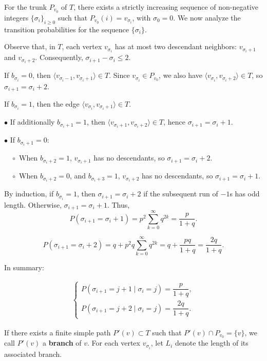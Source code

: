 \documentclass[10pt,twoside]{article}
\begin{document}
For the trunk $P_{v_0}$ of $T$, there exists a strictly increasing sequence of non-negative integers $\{\sigma_i\}_{i \geq 0}$ such that $P_{v_0}(i) = v_{\sigma_i}$, with $\sigma_0 = 0$. We now analyze the transition probabilities for the sequence $\{\sigma_i\}$.

Observe that, in $T$, each vertex $v_{\sigma_i}$ has at most two descendant neighbors: $v_{\sigma_i + 1}$ and $v_{\sigma_i + 2}$. Consequently, $\sigma_{i+1} - \sigma_i \leq 2$.

If $b_{\sigma_i} = 0$, then $\langle v_{\sigma_i - 1}, v_{\sigma_i + 1} \rangle \in T$. Since $v_{\sigma_i} \in P_{v_0}$, we also have $\langle v_{\sigma_i}, v_{\sigma_i + 2} \rangle \in T$, so $\sigma_{i+1} = \sigma_i + 2$.

If $b_{\sigma_i} = 1$, then the edge $\langle v_{\sigma_i}, v_{\sigma_i + 1} \rangle \in T$.

$\bullet$ If additionally $b_{\sigma_i + 1} = 1$, then $\langle v_{\sigma_i + 1}, v_{\sigma_i + 2} \rangle \in T$, hence $\sigma_{i+1} = \sigma_i + 1$.

$\bullet$ If $b_{\sigma_i + 1} = 0$:

$\quad \circ$ When $b_{\sigma_i + 2} = 1$, $v_{\sigma_i + 1}$ has no descendants, so $\sigma_{i+1} = \sigma_i + 2$.

$\quad \circ$ When $b_{\sigma_i + 2} = 0$, and $b_{\sigma_i + 3} = 1$, $v_{\sigma_i + 2}$ has no descendants, so $\sigma_{i+1} = \sigma_i + 1$.

By induction, if $b_{\sigma_i} = 1$, then $\sigma_{i+1} = \sigma_i + 2$ if the subsequent run of $-1$s has odd length. Otherwise, $\sigma_{i+1} = \sigma_i + 1$. Thus,
$$
P(\sigma_{i+1} = \sigma_i + 1)= p^2 \sum_{k=0}^{\infty} q^{2k}= \frac{p}{1 + q}.
$$

$$
P(\sigma_{i+1} = \sigma_i + 2)= q + p^2 q \sum_{k=0}^{\infty} q^{2k}= q + \frac{pq}{1 + q} = \frac{2q}{1+q}.
$$
 
In summary:
 

\begin{eqnarray}
\begin{cases}
P(\sigma_{i+1} = j + 1 \mid \sigma_i = j) = \dfrac{p}{1+q},\\
P(\sigma_{i+1} = j + 2 \mid \sigma_i = j) = \dfrac{2q}{1+q}.
\end{cases}
\end{eqnarray}

 

If there exists a finite simple path $P'(v)\subset T$ such that $P'(v)\cap P_{v_0} = \{v\}$, we call $P'(v)$ a \textbf{branch} of $v$. For each vertex $v_{\sigma_i}$, let $L_i$ denote the length of its associated branch.
\end{document}

